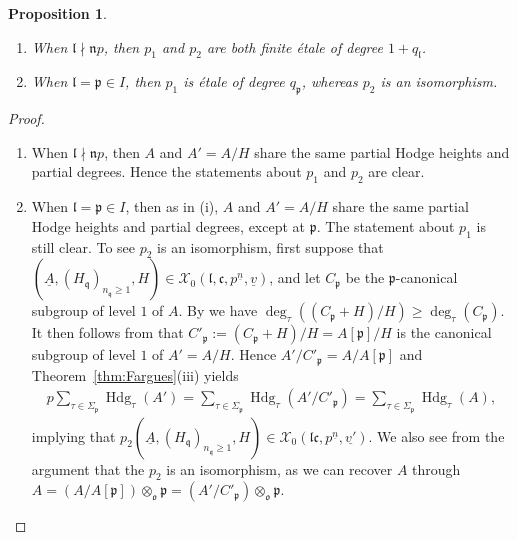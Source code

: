 \documentclass[11pt]{amsart}
\theoremstyle{definition} %
\theoremstyle{plain} %
\newtheorem{proposition}[definition]{Proposition}
\theoremstyle{remark} %
\newcommand{\cX}{{\mathcal X}}
\newcommand{\frakc}{\mathfrak c}
\newcommand{\frakl}{\mathfrak l}
\newcommand{\frakn}{\mathfrak n}
\newcommand{\frako}{\mathfrak o}
\newcommand{\frakp}{\mathfrak p}
\newcommand{\frakq}{\mathfrak q}
\DeclareMathOperator{\Hdg}{Hdg}
\begin{document}
\begin{proposition} \label{prop:Hecke} \hfill
\begin{enumerate}
\item When $\frakl\nmid \frakn p$, then $p_1$ and $p_2$ are both finite \'etale of degree $1+q_\frakl$. 
\item When $\frakl=\frakp\in I$,  then $p_1$  is \'etale of degree $q_\frakp$, whereas $p_2$ is an isomorphism.
\end{enumerate}
\end{proposition}
\begin{proof} \hfill
\begin{enumerate}
\item When $\frakl\nmid \frakn p$, then $A$ and $A'=A/H$  share the same  partial Hodge heights and partial degrees. 
Hence the statements about $p_1$ and $p_2$ are clear.


\item When $\frakl=\frakp\in I$, then as in (i), $A$ and $A'=A/H$ share the same  partial Hodge heights and partial degrees, except at $\frakp$. The statement about $p_1$ is still clear. To see $p_2$ is an isomorphism, first suppose that $(\underline{A},(H_{\frakq})_{n_\frakq\geqslant 1}, H)\in \cX_0(\frakl,\frakc,p^{\underline{n}},\underline{v})$, and let $C_\frakp$ be the $\frakp$-canonical subgroup of level $1$ of $A$. 
By  \cite[Cor.~3]{Fargues} we have $\deg_\tau ((C_\frakp+H)/H) \geqslant \deg_\tau (C_\frakp)$.
It then follows from 
 \cite[Prop.~3.1.2]{AIP_Siegel} that $C'_\frakp:=(C_\frakp+H)/H=A[\frakp]/H$ is the canonical subgroup of level $1$ of $A'=A/H$. 
 Hence $A'/C'_\frakp=A/A[\frakp]$ and Theorem~\ref{thm:Fargues}(iii) yields
 \begin{align*}
p \sum_{\tau\in\Sigma_\frakp}\Hdg_\tau(A') = \sum_{\tau\in\Sigma_\frakp}\Hdg_\tau(A'/C'_\frakp)= \sum_{\tau\in\Sigma_\frakp}\Hdg_\tau(A),
\end{align*}
implying that  $p_2(\underline{A},(H_{\frakq})_{n_\frakq\geqslant 1}, H) \in \cX_0(\frakl\frakc,p^{\underline{n}},\underline{v'})$.
We also see from the argument that the $p_2$ is an isomorphism, as we can recover $A$ through $A=(A/A[\frakp]) \otimes_{\frako} \frakp=(A'/C'_\frakp) \otimes_{\frako} \frakp$.
\end{enumerate}
\qedhere

\end{proof}
\end{document}
